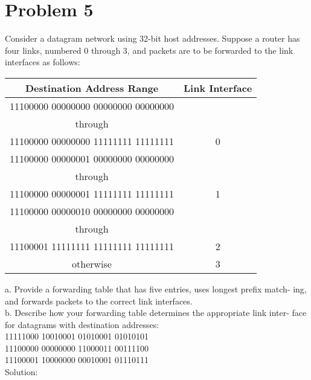 \documentclass{article}
\begin{document}
\section{Problem 5} Consider a datagram network using 32-bit host addresses. Suppose a router has four links, numbered 0 through 3, and packets are to be forwarded to the link interfaces as follows:\\
\begin{center}
  \begin{tabular}{@{} cc @{}}
    \hline
    {\bfseries Destination Address Range} & {\bfseries Link Interface} \\ 
    \hline
    11100000 00000000 00000000 00000000\\through\\11100000 00000000 11111111 11111111 & 0 \\ 
    11100000 00000001 00000000 00000000\\through\\11100000 00000001 11111111 11111111 & 1 \\ 
    11100000 00000010 00000000 00000000\\through\\11100001 11111111 11111111 11111111 & 2 \\ 
    otherwise & 3 \\ 
    \hline
  \end{tabular}
\end{center}
 a. Provide a forwarding table that has five entries, uses longest prefix match- ing, and forwards packets to the correct link interfaces.\\
b. Describe how your forwarding table determines the appropriate link inter- face for datagrams with destination addresses:\\
11111000 10010001 01010001 01010101\\ 11100000 00000000 11000011 00111100\\ 11100001 10000000 00010001 01110111\\

\noindent Solution: \\
\end{document}
